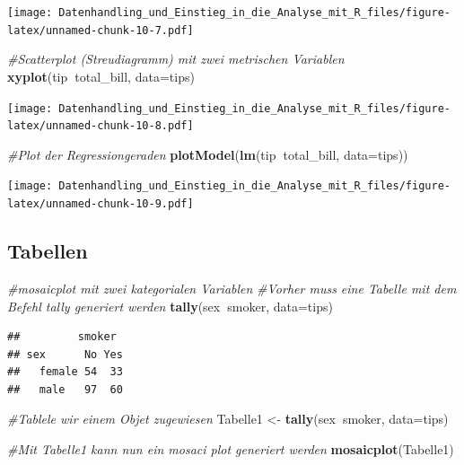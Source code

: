 \documentclass[10pt,ngerman,onside]{article}
\newenvironment{Shaded}{\begin{snugshade}}{\end{snugshade}}
\newcommand{\KeywordTok}[1]{\textcolor[rgb]{0.13,0.29,0.53}{\textbf{#1}}}
\newcommand{\DataTypeTok}[1]{\textcolor[rgb]{0.13,0.29,0.53}{#1}}
\newcommand{\StringTok}[1]{\textcolor[rgb]{0.31,0.60,0.02}{#1}}
\newcommand{\CommentTok}[1]{\textcolor[rgb]{0.56,0.35,0.01}{\textit{#1}}}
\newcommand{\OperatorTok}[1]{\textcolor[rgb]{0.81,0.36,0.00}{\textbf{#1}}}
\newcommand{\NormalTok}[1]{#1}
\begin{document}
\texttt{[image: Datenhandling\_und\_Einstieg\_in\_die\_Analyse\_mit\_R\_files/figure-latex/unnamed-chunk-10-7.pdf]}

\begin{Shaded}
\begin{Highlighting}[]
\CommentTok{#Scatterplot (Streudiagramm) mit zwei metrischen Variablen}
\KeywordTok{xyplot}\NormalTok{(tip}\OperatorTok{~}\NormalTok{total_bill, }\DataTypeTok{data=}\NormalTok{tips)}
\end{Highlighting}
\end{Shaded}

\texttt{[image: Datenhandling\_und\_Einstieg\_in\_die\_Analyse\_mit\_R\_files/figure-latex/unnamed-chunk-10-8.pdf]}

\begin{Shaded}
\begin{Highlighting}[]
\CommentTok{#Plot der Regressiongeraden}
\KeywordTok{plotModel}\NormalTok{(}\KeywordTok{lm}\NormalTok{(tip}\OperatorTok{~}\NormalTok{total_bill, }\DataTypeTok{data=}\NormalTok{tips))}
\end{Highlighting}
\end{Shaded}

\texttt{[image: Datenhandling\_und\_Einstieg\_in\_die\_Analyse\_mit\_R\_files/figure-latex/unnamed-chunk-10-9.pdf]}

\hypertarget{tabellen}{%
\subsection{Tabellen}\label{tabellen}}

\begin{Shaded}
\begin{Highlighting}[]
\CommentTok{#mosaicplot mit zwei kategorialen Variablen}
\CommentTok{#Vorher muss eine Tabelle mit dem Befehl tally generiert werden}
\KeywordTok{tally}\NormalTok{(sex}\OperatorTok{~}\NormalTok{smoker, }\DataTypeTok{data=}\NormalTok{tips)}
\end{Highlighting}
\end{Shaded}

\begin{verbatim}
##         smoker
## sex      No Yes
##   female 54  33
##   male   97  60
\end{verbatim}

\begin{Shaded}
\begin{Highlighting}[]
\CommentTok{#Tablele wir einem Objet zugewiesen}
\NormalTok{Tabelle1 <-}\StringTok{ }\KeywordTok{tally}\NormalTok{(sex}\OperatorTok{~}\NormalTok{smoker, }\DataTypeTok{data=}\NormalTok{tips)}

\CommentTok{#Mit Tabelle1 kann nun ein mosaci plot generiert werden}
\KeywordTok{mosaicplot}\NormalTok{(Tabelle1)}
\end{Highlighting}
\end{Shaded}
\end{document}
